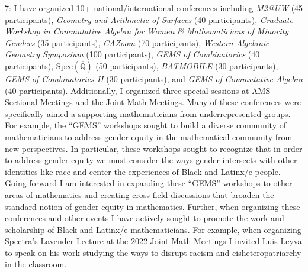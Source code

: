 \documentclass[11pt]{article}
\begin{document}
7: I have organized 10+ national/international conferences including \textit{M2@UW} (45 participants), \textit{Geometry and Arithmetic of Surfaces} (40 participants), \textit{Graduate Workshop in Commutative Algebra for Women \& Mathematicians of Minority Genders} (35 participants), \textit{CAZoom} (70 participants), \textit{Western Algebraic Geometry Symposium} (100 participants), \textit{GEMS of Combinatorics} (40 participants), $\text{Spec}(\overline{\mathbb{Q}})$ (50 participants), \textit{BATMOBILE} (30 participants),  \textit{GEMS of Combinatorics II} (30 participants), and \textit{GEMS of Commutative Algebra} (40 participants). Additionally, I organized three special sessions at AMS Sectional Meetings and the Joint Math Meetings. Many of these conferences were specifically aimed a supporting mathematicians from underrepresented groups. For example, the ``GEMS'' workshops sought to build a diverse community of mathematicians to address gender equity in the mathematical community from new perspectives. In particular, these workshops sought to recognize that in order to address gender equity we must consider the ways gender intersects with other identities like race and center the experiences of Black and Latinx/e people. Going forward I am interested in expanding these ``GEMS'' workshops to other areas of mathematics and creating cross-field discussions that broaden the standard notion of gender equity in mathematics. Further, when organizing these conferences and other events I have actively sought to promote the work and scholarship of Black and Latinx/e mathematicians. For example, when organizing Spectra's Lavender Lecture at the 2022 Joint Math Meetings I invited Luis Leyva to speak on his work studying the ways to disrupt racism and cisheteropatriarchy in the classroom. 
\end{document}
